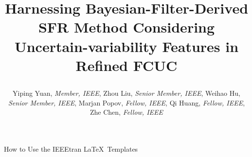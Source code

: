 \documentclass[lettersize,journal]{IEEEtran}
\begin{document}
% 


\vspace{-2.5in}

\title{ \vspace{-0.5em}

{\selectfont \fontsize{20}{20}\selectfont Harnessing Bayesian-Filter-Derived SFR Method Considering Uncertain-variability Features in Refined FCUC} }
\vspace{-2.5in}

\author{\fontsize{11}{8} \selectfont Yiping Yuan, \textit{Member, IEEE}, Zhou Liu, \textit{Senior Member, IEEE}, Weihao Hu, \textit{Senior Member, IEEE},  Marjan Popov, \textit{Fellow, IEEE}, Qi
Huang, \textit{Fellow, IEEE}, Zhe Chen, \textit{Fellow, IEEE} \vspace{-2.5em}}

%
{How to Use the IEEEtran \LaTeX \ Templates}
\end{document}

